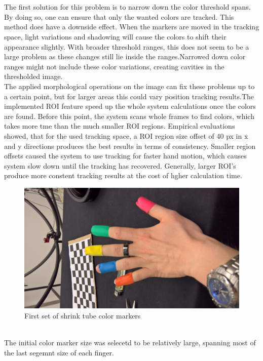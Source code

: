 \\\\The first solution for this problem is to narrow down the color threshold spans. By doing so, one can ensure that only the wanted colors are tracked. This method does have a downside effect. When the markers are moved in the tracking space, light variations and shadowing will cause the colors to shift their appearance slightly. With broader threshold ranges, this does not seem to be a large problem as these changes still lie inside the ranges.Narrowed down color ranges might not include these color variations, creating cavities in the thresholded image.\\ The applied morphological operations on the image can fix these problems up to a certain point, but for larger areas this could vary position tracking results.The implemented ROI feature speed up the whole system calculations once the colors are found. Before this point, the system scans whole frames to find colors, which takes more tme than the much smaller ROI regions.
Empirical evaluations showed, that for the used tracking space, a ROI region size offset of 40 px in x and y directions produces the best results in terms of consistency. Smaller region offsets caused the system to use tracking for faster hand motion, which causes system slow down until the tracking has recovered. Generally, larger ROI's produce more constent tracking results at the cost of hgher calculation time.
\begin{figure} 
\centering
\includegraphics[width=\textwidth/2,angle=-90]{images/color_markers_hand.jpg}
\caption{First set of shrink tube color markers }
\label{img:first_set_color_markers}
\end{figure}
\\The initial color marker size was selecetd to be relatively large, spanning most of the last segemnt size of each finger.
